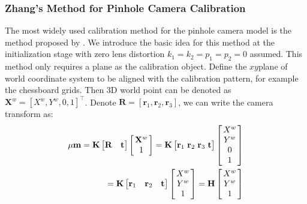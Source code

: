 \documentclass{report}
\begin{document}
\subsubsection{Zhang's Method for Pinhole Camera Calibration}
The most widely used calibration method for the pinhole camera model is the method proposed by \cite{zhang2000flexible}. We introduce the basic idea for this method at the initialization stage with zero lens distortion $k_1 = k_2 = p_1 = p_2 = 0$ assumed. This method only requires a plane as the calibration object. Define the $xy$plane of world coordinate system to be aligned with the calibration pattern, for example the chessboard grids. Then 3D world point can be denoted as $\mathbf{X}^w = [X^w, Y^w, 0, 1]^\top$. Denote $\mathbf{R} = [\mathbf{r}_1, \mathbf{r}_2, \mathbf{r}_3]$, we can write the camera transform as: 
\begin{equation}
\begin{split}
\mu \mathbf{m} = \mathbf{K}
\begin{bmatrix}
\mathbf{R} & \mathbf{t}
\end{bmatrix}
\arraycolsep=1.5pt%
\begin{bmatrix}
	\begin{array}{c}
	\mathbf{X}^w \\ 1
	\end{array}
\end{bmatrix}
= \mathbf{K}
\begin{bmatrix}
\mathbf{r}_1 & \mathbf{r}_2 & \mathbf{r}_3 & \mathbf{t}
\end{bmatrix}
\arraycolsep=1.5pt%
\begin{bmatrix}
	\begin{array}{c}
	X^w \\ Y^w \\ 0 \\ 1
	\end{array}
\end{bmatrix}\\
= \mathbf{K}
\begin{bmatrix}
\mathbf{r}_1 & \mathbf{r}_2 & \mathbf{t}
\end{bmatrix}
\arraycolsep=1.5pt%
\begin{bmatrix}
	\begin{array}{c}
	X^w \\ Y^w \\ 1
	\end{array}
\end{bmatrix}
=\mathbf{H}
\arraycolsep=1.5pt%
\begin{bmatrix}
	\begin{array}{c}
	X^w \\ Y^w \\ 1
	\end{array}
\end{bmatrix}
\end{split}
\end{equation}
\end{document}
